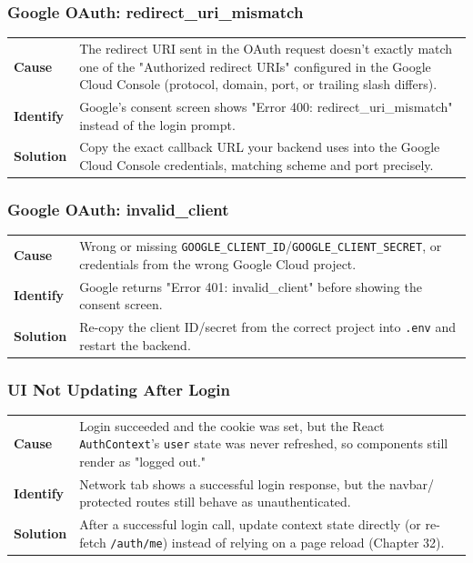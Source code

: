 \subsubsection*{Google OAuth: redirect\_uri\_mismatch}
\noindent\begin{tabularx}{\textwidth}{@{}>{\bfseries}p{2.3cm}X@{}}
\toprule
Cause & The redirect URI sent in the OAuth request doesn't exactly match
one of the "Authorized redirect URIs" configured in the Google Cloud
Console (protocol, domain, port, or trailing slash differs). \\
Identify & Google's consent screen shows "Error 400:
redirect\_uri\_mismatch" instead of the login prompt. \\
Solution & Copy the exact callback URL your backend uses into the Google
Cloud Console credentials, matching scheme and port precisely. \\
\bottomrule
\end{tabularx}

\subsubsection*{Google OAuth: invalid\_client}
\noindent\begin{tabularx}{\textwidth}{@{}>{\bfseries}p{2.3cm}X@{}}
\toprule
Cause & Wrong or missing \texttt{GOOGLE\_CLIENT\_ID}/\texttt{GOOGLE\_CLIENT\_SECRET},
or credentials from the wrong Google Cloud project. \\
Identify & Google returns "Error 401: invalid\_client" before showing the
consent screen. \\
Solution & Re-copy the client ID/secret from the correct project into
\texttt{.env} and restart the backend. \\
\bottomrule
\end{tabularx}

\subsubsection*{UI Not Updating After Login}
\noindent\begin{tabularx}{\textwidth}{@{}>{\bfseries}p{2.3cm}X@{}}
\toprule
Cause & Login succeeded and the cookie was set, but the React
\texttt{AuthContext}'s \texttt{user} state was never refreshed, so
components still render as "logged out." \\
Identify & Network tab shows a successful login response, but the navbar/
protected routes still behave as unauthenticated. \\
Solution & After a successful login call, update context state directly
(or re-fetch \texttt{/auth/me}) instead of relying on a page reload
(Chapter 32). \\
\bottomrule
\end{tabularx}
